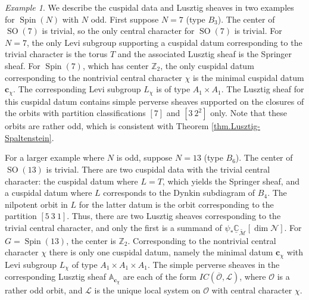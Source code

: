 \documentclass[reqno,11pt]{amsart}
\theoremstyle{remark}
\theoremstyle{remark}
\newtheorem{example}[Thm]{Example}
\theoremstyle{definition}
\theoremstyle{definition}
\theoremstyle{definition}
\numberwithin{equation}{section}
\newcommand{\C}{\mathbb{C}}           %
\newcommand{\Z}{\mathbb{ Z}}           %
\newcommand{\SO}{\operatorname{SO}}
\newcommand{\Spin}{\operatorname{Spin}}
\newcommand{\cl}{\mathcal{L}}
\newcommand{\cm}{\mathcal{M}}
\newcommand{\cn}{\mathcal{N}}
\newcommand{\co}{\mathcal{O}}
\newcommand{\shc}{\underline{\C}}
\renewcommand{\tilde}{\widetilde}
\renewcommand{\bar}[1]{\overline{#1}}
\begin{document}
\begin{example}\label{ex.Spin.odd}
We describe the cuspidal data and Lusztig sheaves in two examples for $\Spin(N)$ with $N$ odd.
First suppose $N = 7$ (type $B_3$).  The center of $\SO(7)$ is trivial, so the only central character for $\SO(7)$ is
trivial.  For $N=7$, the only Levi subgroup supporting a cuspidal datum corresponding to the trivial character is the torus $T$ and the associated Lusztig sheaf is the Springer sheaf.   For $\Spin(7)$, which has center $\Z_2$, the only cuspidal datum corresponding to the nontrivial central character $\chi$ is the minimal cuspidal datum $\mathbf{c}_\chi$. The corresponding Levi subgroup $L_\chi$ is of type $A_1 \times A_1$. The Lusztig sheaf for this cuspidal datum contains simple perverse sheaves supported on the closures of the orbits with partition classifications $[7]$ and $[3\ 2^2]$ only.  Note that 
these orbits are rather odd, which is consistent with Theorem \ref{thm.Lusztig-Spaltenstein}.

For a larger example where $N$ is odd, suppose $N = 13$ (type $B_6$).   
The center of $\SO(13)$ is trivial.  There are two cuspidal data with the trivial central character: the cuspidal datum where $L = T$, which yields the Springer sheaf, and a cuspidal datum where $L$ corresponds to the Dynkin subdiagram of $B_4$.  The nilpotent orbit in $L$ for the latter datum is the orbit corresponding to the partition $[5 \ 3 \ 1]$.  Thus, there are two Lusztig sheaves corresponding to the trivial central character, and only the first is a summand of $\psi_*\shc_{\tilde{\cm}}[\dim \cn]$.   For $G = \Spin(13)$,
the center is $\Z_2$.  Corresponding to the nontrivial central character $\chi$ there is only one cuspidal datum, namely the minimal datum $\mathbf{c}_\chi$ with Levi subgroup $L_\chi$ of type $A_1 \times A_1 \times A_1$.
The simple perverse sheaves in the corresponding Lusztig sheaf $\mathbb{A}_{\mathbf{c}_\chi}$ are each of the form  $IC(\bar{\co}, \cl)$, where $\co$ is a rather odd orbit, and $\cl$ is the unique local system on $\co$ with central character $\chi$.
\end{example}
\end{document}
